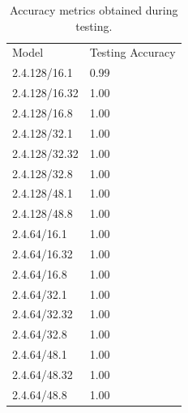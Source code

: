 \documentclass[12pt]{article}
\begin{document}
\begin{table}[H]
\centering
\begin{tabular}{ll}
Model & Testing Accuracy \\
  2.4.128/16.1    &      0.99   \\
  2.4.128/16.32    &      1.00   \\
  2.4.128/16.8    &      1.00   \\
  2.4.128/32.1    &      1.00   \\
  2.4.128/32.32    &      1.00   \\
  2.4.128/32.8    &      1.00   \\
  2.4.128/48.1    &      1.00   \\
  2.4.128/48.8    &      1.00   \\
  2.4.64/16.1    &      1.00   \\
  2.4.64/16.32    &      1.00   \\
  2.4.64/16.8    &      1.00   \\
  2.4.64/32.1    &      1.00   \\
  2.4.64/32.32    &      1.00   \\
  2.4.64/32.8    &      1.00   \\
  2.4.64/48.1    &      1.00   \\
  2.4.64/48.32    &      1.00   \\
  2.4.64/48.8    &      1.00   \\
\end{tabular}
\caption{Accuracy metrics obtained during testing.}
\label{tab:testing-accuracy}
\end{table}

\pagebreak
\end{document}
